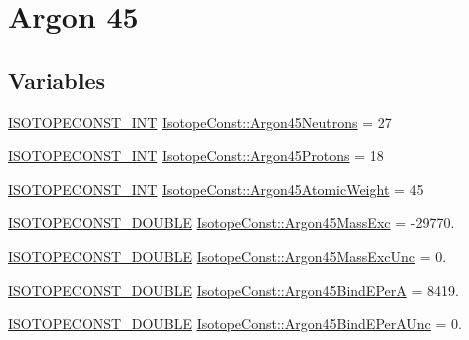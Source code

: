\hypertarget{group___isotope_const-_argon-_ar45}{}\section{Argon 45}
\label{group___isotope_const-_argon-_ar45}
\subsection*{Variables}
\begin{DoxyCompactItemize}
\item 
\mbox{\hyperlink{group___isotope_const-_macros_ga5f18360b3e99483a35c32d789e62621c}{I\+S\+O\+T\+O\+P\+E\+C\+O\+N\+S\+T\+\_\+\+I\+NT}} \mbox{\hyperlink{group___isotope_const-_argon-_ar45_ga2a853ad36c42e0a41dd29a7eeee7a258}{Isotope\+Const\+::\+Argon45\+Neutrons}} = 27
\item 
\mbox{\hyperlink{group___isotope_const-_macros_ga5f18360b3e99483a35c32d789e62621c}{I\+S\+O\+T\+O\+P\+E\+C\+O\+N\+S\+T\+\_\+\+I\+NT}} \mbox{\hyperlink{group___isotope_const-_argon-_ar45_ga6e569469cd8106332dbb9ee2bba71a92}{Isotope\+Const\+::\+Argon45\+Protons}} = 18
\item 
\mbox{\hyperlink{group___isotope_const-_macros_ga5f18360b3e99483a35c32d789e62621c}{I\+S\+O\+T\+O\+P\+E\+C\+O\+N\+S\+T\+\_\+\+I\+NT}} \mbox{\hyperlink{group___isotope_const-_argon-_ar45_ga69825735fc7c7288c41d9f7e10f5728e}{Isotope\+Const\+::\+Argon45\+Atomic\+Weight}} = 45
\item 
\mbox{\hyperlink{group___isotope_const-_macros_ga8f45a7272ce02c0b4c65c44636ed719a}{I\+S\+O\+T\+O\+P\+E\+C\+O\+N\+S\+T\+\_\+\+D\+O\+U\+B\+LE}} \mbox{\hyperlink{group___isotope_const-_argon-_ar45_ga8e7de8867473d787d4823b449e958018}{Isotope\+Const\+::\+Argon45\+Mass\+Exc}} = -\/29770.
\item 
\mbox{\hyperlink{group___isotope_const-_macros_ga8f45a7272ce02c0b4c65c44636ed719a}{I\+S\+O\+T\+O\+P\+E\+C\+O\+N\+S\+T\+\_\+\+D\+O\+U\+B\+LE}} \mbox{\hyperlink{group___isotope_const-_argon-_ar45_ga5c0a7e1770ecb0cf7f91915e51f340ef}{Isotope\+Const\+::\+Argon45\+Mass\+Exc\+Unc}} = 0.
\item 
\mbox{\hyperlink{group___isotope_const-_macros_ga8f45a7272ce02c0b4c65c44636ed719a}{I\+S\+O\+T\+O\+P\+E\+C\+O\+N\+S\+T\+\_\+\+D\+O\+U\+B\+LE}} \mbox{\hyperlink{group___isotope_const-_argon-_ar45_ga890957e4bf53cf2749050e47b39f1409}{Isotope\+Const\+::\+Argon45\+Bind\+E\+PerA}} = 8419.
\item 
\mbox{\hyperlink{group___isotope_const-_macros_ga8f45a7272ce02c0b4c65c44636ed719a}{I\+S\+O\+T\+O\+P\+E\+C\+O\+N\+S\+T\+\_\+\+D\+O\+U\+B\+LE}} \mbox{\hyperlink{group___isotope_const-_argon-_ar45_ga6ee2635ea87814e79161c6d190e1c2d7}{Isotope\+Const\+::\+Argon45\+Bind\+E\+Per\+A\+Unc}} = 0.

\end{DoxyCompactItemize}
